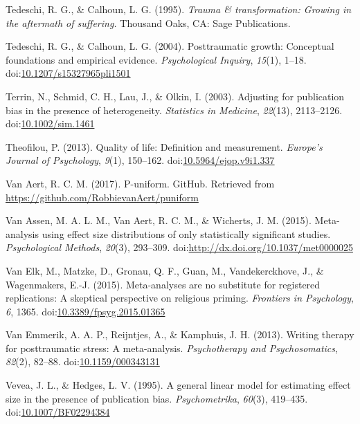 \documentclass[english,man, mask]{apa6}
\theoremstyle{definition}
\theoremstyle{definition}
\theoremstyle{definition}
\theoremstyle{remark}
\begin{document}
\hypertarget{ref-Tedeschi1995}{}
Tedeschi, R. G., \& Calhoun, L. G. (1995). \emph{Trauma \&
transformation: Growing in the aftermath of suffering.} Thousand Oaks,
CA: Sage Publications.

\hypertarget{ref-Tedeschi2004}{}
Tedeschi, R. G., \& Calhoun, L. G. (2004). Posttraumatic growth:
Conceptual foundations and empirical evidence. \emph{Psychological
Inquiry}, \emph{15}(1), 1--18.
doi:\href{https://doi.org/10.1207/s15327965pli1501}{10.1207/s15327965pli1501}

\hypertarget{ref-Terrin2003}{}
Terrin, N., Schmid, C. H., Lau, J., \& Olkin, I. (2003). Adjusting for
publication bias in the presence of heterogeneity. \emph{Statistics in
Medicine}, \emph{22}(13), 2113--2126.
doi:\href{https://doi.org/10.1002/sim.1461}{10.1002/sim.1461}

\hypertarget{ref-Theofilou2013}{}
Theofilou, P. (2013). Quality of life: Definition and measurement.
\emph{Europe's Journal of Psychology}, \emph{9}(1), 150--162.
doi:\href{https://doi.org/10.5964/ejop.v9i1.337}{10.5964/ejop.v9i1.337}

\hypertarget{ref-VanAert2017}{}
Van Aert, R. C. M. (2017). P-uniform. GitHub. Retrieved from
\url{https://github.com/RobbievanAert/puniform}

\hypertarget{ref-VanAssen2015}{}
Van Assen, M. A. L. M., Van Aert, R. C. M., \& Wicherts, J. M. (2015).
Meta-analysis using effect size distributions of only statistically
significant studies. \emph{Psychological Methods}, \emph{20}(3),
293--309.
doi:\href{https://doi.org/http://dx.doi.org/10.1037/met0000025}{http://dx.doi.org/10.1037/met0000025}

\hypertarget{ref-VanElk2015}{}
Van Elk, M., Matzke, D., Gronau, Q. F., Guan, M., Vandekerckhove, J., \&
Wagenmakers, E.-J. (2015). Meta-analyses are no substitute for
registered replications: A skeptical perspective on religious priming.
\emph{Frontiers in Psychology}, \emph{6}, 1365.
doi:\href{https://doi.org/10.3389/fpsyg.2015.01365}{10.3389/fpsyg.2015.01365}

\hypertarget{ref-VanEmmerik2013}{}
Van Emmerik, A. A. P., Reijntjes, A., \& Kamphuis, J. H. (2013). Writing
therapy for posttraumatic stress: A meta-analysis. \emph{Psychotherapy
and Psychosomatics}, \emph{82}(2), 82--88.
doi:\href{https://doi.org/10.1159/000343131}{10.1159/000343131}

\hypertarget{ref-Vevea1995}{}
Vevea, J. L., \& Hedges, L. V. (1995). A general linear model for
estimating effect size in the presence of publication bias.
\emph{Psychometrika}, \emph{60}(3), 419--435.
doi:\href{https://doi.org/10.1007/BF02294384}{10.1007/BF02294384}
\end{document}
